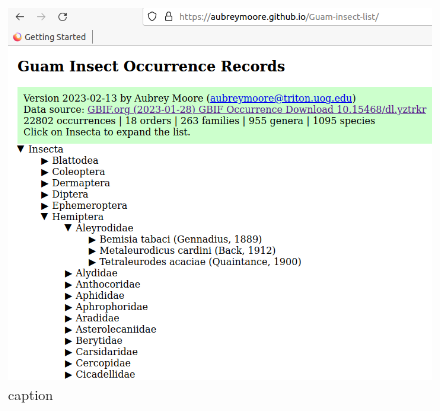 \documentclass[12pt,letterpaper,english,bibliography=totocnumbered, abstract=on]{scrartcl}
\begin{document}
\begin{figure}[h]
	\centering
	\includegraphics[width=\linewidth]{images/guam-insect-occurrence-records}
	\caption{caption}
	\label{fig:guam-insect-occurrence-records}
\end{figure}

\clearpage



\end{document}
